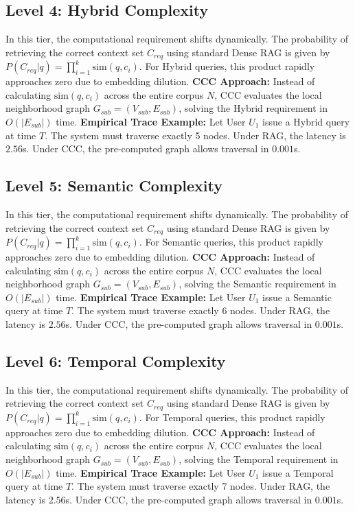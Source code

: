 \subsection{Level 4: Hybrid Complexity}
In this tier, the computational requirement shifts dynamically. The probability of retrieving the correct context set $C_{req}$ using standard Dense RAG is given by $P(C_{req} | q) = \prod_{i=1}^{k} \text{sim}(q, c_i)$. For Hybrid queries, this product rapidly approaches zero due to embedding dilution. 
\textbf{CCC Approach:} Instead of calculating $\text{sim}(q, c_i)$ across the entire corpus $N$, CCC evaluates the local neighborhood graph $G_{sub} = (V_{sub}, E_{sub})$, solving the Hybrid requirement in $O(|E_{sub}|)$ time.
\textbf{Empirical Trace Example:} 
Let User $U_1$ issue a Hybrid query at time $T$. The system must traverse exactly 5 nodes. Under RAG, the latency is $2.56$s. Under CCC, the pre-computed graph allows traversal in $0.001$s.

\subsection{Level 5: Semantic Complexity}
In this tier, the computational requirement shifts dynamically. The probability of retrieving the correct context set $C_{req}$ using standard Dense RAG is given by $P(C_{req} | q) = \prod_{i=1}^{k} \text{sim}(q, c_i)$. For Semantic queries, this product rapidly approaches zero due to embedding dilution. 
\textbf{CCC Approach:} Instead of calculating $\text{sim}(q, c_i)$ across the entire corpus $N$, CCC evaluates the local neighborhood graph $G_{sub} = (V_{sub}, E_{sub})$, solving the Semantic requirement in $O(|E_{sub}|)$ time.
\textbf{Empirical Trace Example:} 
Let User $U_1$ issue a Semantic query at time $T$. The system must traverse exactly 6 nodes. Under RAG, the latency is $2.56$s. Under CCC, the pre-computed graph allows traversal in $0.001$s.

\subsection{Level 6: Temporal Complexity}
In this tier, the computational requirement shifts dynamically. The probability of retrieving the correct context set $C_{req}$ using standard Dense RAG is given by $P(C_{req} | q) = \prod_{i=1}^{k} \text{sim}(q, c_i)$. For Temporal queries, this product rapidly approaches zero due to embedding dilution. 
\textbf{CCC Approach:} Instead of calculating $\text{sim}(q, c_i)$ across the entire corpus $N$, CCC evaluates the local neighborhood graph $G_{sub} = (V_{sub}, E_{sub})$, solving the Temporal requirement in $O(|E_{sub}|)$ time.
\textbf{Empirical Trace Example:} 
Let User $U_1$ issue a Temporal query at time $T$. The system must traverse exactly 7 nodes. Under RAG, the latency is $2.56$s. Under CCC, the pre-computed graph allows traversal in $0.001$s.

